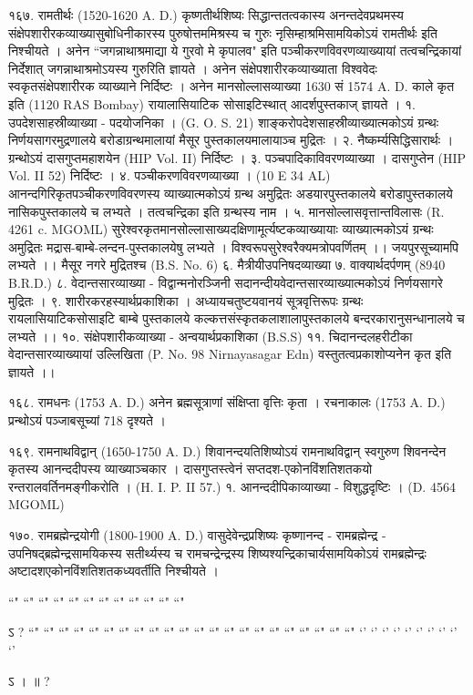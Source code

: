 १६७. रामतीर्थः (1520-1620 A. D.)
कृष्णतीर्थशिष्यः सिद्धान्ततत्वकास्य अनन्तदेवप्रथमस्य संक्षेपशारीरकव्याख्यासुबोधिनीकारस्य पुरुषोत्तममिश्रस्य च गुरुः नृसिम्हाश्रमिसामयिकोऽयं रामतीर्थः इति निश्चीयते । अनेन ``जगन्नाथाश्रमाद्या ये गुरवो मे कृपालव" इति पञ्चीकरणविवरणव्याख्यायां तत्वचन्द्रिकायां निर्देशात् जगन्नाथाश्रमोऽयस्य गुरुरिति ज्ञायते । अनेन संक्षेपशारीरकव्याख्याता विश्ववेदः स्वकृतसंक्षेपशारीरक व्याख्याने निर्दिष्टः । अनेन मानसोल्लासव्याख्या 1630 सं 1574 A. D. काले कृत इति (1120 RAS Bombay) रायालासियाटिक सोसाइटिस्थात् आदर्शपुस्तकाज् ज्ञायते ।
१. उपदेशसाहस्रीव्याख्या - पदयोजनिका । (G. O. S. 21)
शाङ्करोपदेशसाहस्रीव्याख्यात्मकोऽयं ग्रन्थः निर्णयसागरमुद्रणालये बरोडाग्रन्थमालायां मैसूर पुस्तकालयमालायाञ्च मुद्रितः ।
२. नैष्कर्म्यसिद्धिसारार्थः । ग्रन्थोऽयं दासगुप्तमहाशयेन (HIP Vol. II) निर्दिष्टः ।
३. पञ्चपादिकाविवरणव्याख्या । दासगुप्तेन (HIP Vol. II 52) निर्दिष्टः ।
४. पञ्चीकरणविवरणव्याख्या । (10 E 34 AL)
आनन्दगिरिकृतपञ्चीकरणविवरणस्य व्याख्यात्मकोऽयं ग्रन्थ अमुद्रितः अडयारपुस्तकालये बरोडापुस्तकालये नासिकपुस्तकालये च लभ्यते । तत्वचन्द्रिका इति ग्रन्थस्य नाम ।
५. मानसोल्लासवृत्तान्तविलासः (R. 4261 c. MGOML)
सुरेश्वरकृतमानसोल्लासाख्यदक्षिणामूर्त्यष्टकव्याख्यायाः व्याख्यात्मकोऽयं ग्रन्थः अमुद्रितः मद्रास-बाम्बे-लन्दन-पुस्तकालयेषु लभ्यते । विश्वरूपसुरेश्वरैक्यमत्रोपवर्णितम् ।। जयपुरसूच्यामपि लभ्यते ।। मैसूर नगरे मुद्रितश्च (B.S. No. 6) 
६. मैत्रीयीउपनिषदव्याख्या
७. वाक्यार्थदर्पणम् (8940 B.R.D.)
८. वेदान्तसारव्याख्या - विद्वान्मनोरञ्जिनी सदानन्दीयवेदान्तसारव्याख्यात्मकोऽयं निर्णयसागरे मुद्रितः ।
९. शारीरकरहस्यार्थप्रकाशिका । अध्यायचतुष्टयवानयं सूत्रवृत्तिरूपः ग्रन्थः रायलासियाटिकसोसाइटि बाम्बे पुस्तकालये कल्कत्तसंस्कृतकलाशालापुस्तकालये बन्दरकारानुसन्धानालये च लभ्यते ।।
१०. संक्षेपशारीकव्याख्या - अन्वयार्थप्रकाशिका (B.S.S)
११. चिदानन्दलहरीटीका वेदान्तसारव्याख्यायां उल्लिखिता (P. No. 98 Nirnayasagar Edn) वस्तुतत्वप्रकाशोप्यनेन कृत इति ज्ञायते ।।

१६८. रामधनः (1753 A. D.)
अनेन ब्रह्मसूत्राणां संक्षिप्ता वृत्तिः कृता । रचनाकालः (1753 A. D.) प्रन्थोऽयं पञ्जाबसूच्यां 718 दृश्यते ।

१६९. रामनाथविद्वान् (1650-1750 A. D.)
शिवानन्दयतिशिष्योऽयं रामनाथविद्वान् स्वगुरुण शिवनन्देन कृतस्य आनन्ददीपस्य व्याख्याञ्चकार । दासगुप्तस्त्वेनं सप्तदश-एकोनविंशतिशतकयो रन्तरालवर्तिनमङ्गीकरोति । (H. I. P. II 57.)
१. आनन्ददीपिकाव्याख्या - विशुद्धदृष्टिः । (D. 4564 MGOML)

१७०. रामब्रह्मेन्द्रयोगी (1800-1900 A. D.)
वासुदेवेन्द्रप्रशिष्यः कृष्णानन्द - रामब्रह्मेन्द्र - उपनिषद्ब्रह्मेन्द्रसामयिकस्य सतीर्थ्यस्य च रामचन्द्रेन्द्रस्य शिष्यश्यन्द्रिकाचार्यसामयिकोऽयं रामब्रह्मेन्द्रः अष्टादशएकोनविंशतिशतकध्यवर्तीति निश्चीयते ।

 ``" ``" ``" ``" ``" ``" ``" ``" ``" ``" ``" ``"

ऽ  ?
``" ``" ``" ``" ``" ``" ``" ``" ``" ``" ``" ``" ``" ``" ``" ``" ``" ``" ``" ``" ``" ``"
`' `' `' `' `' `' `' `' `' `' 

ऽ  ।   ॥ ?

